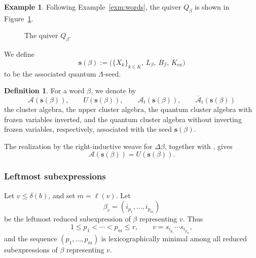 \documentclass[12pt, reqno]{amsart}
\theoremstyle{plain}
\theoremstyle{definition}
\newtheorem{definition}[theorem]{Definition}
\newtheorem{example}[theorem]{Example}
\numberwithin{equation}{section}
\begin{document}
\begin{example}\label{exm:quiver}
Following Example~\ref{exm:words}, the quiver \(Q_\beta\) is shown in
Figure~\ref{fig:Qbeta}.
\begin{figure}[htbp]
\centering
{}
\caption{The quiver \(Q_{\beta}\).}
\label{fig:Qbeta}
\end{figure}
\end{example}

We define
\[
\mathbf{s}(\beta)
:=
\bigl(\{X_k\}_{k\in K},\,L_\beta,\,B_\beta,\,K_{\mathrm{ex}}\bigr)
\]
to be the associated quantum \(\Lambda\)-seed.

\begin{definition}
For a word \(\beta\), we denote by
\[
\mathcal{A}(\mathbf{s}(\beta)),\qquad
U(\mathbf{s}(\beta)),\qquad
\mathcal{A}_t(\mathbf{s}(\beta)),\qquad
\overline{\mathcal{A}}_t(\mathbf{s}(\beta))
\]
the cluster algebra, the upper cluster algebra, the quantum cluster algebra
with frozen variables inverted, and the quantum cluster algebra without
inverting frozen variables, respectively, associated with the seed
\(\mathbf{s}(\beta)\).

The realization by the right-inductive weave for
\(\Delta\beta\), together with
\cite[Theorem~7.13]{casals2025cluster}, gives
\[
\mathcal{A}(\mathbf{s}(\beta))=U(\mathbf{s}(\beta)).
\]
\end{definition}


\subsubsection{Leftmost subexpressions}

Let \(v\le \delta(b)\), and set \(m=\ell(v)\). Let
\[
\beta_v=(i_{p_1},\dots,i_{p_m})
\]
be the leftmost reduced subexpression of \(\beta\) representing \(v\). Thus
\[
1\le p_1<\cdots<p_m\le r,
\qquad
v=s_{i_{p_1}}\cdots s_{i_{p_m}},
\]
and the sequence \((p_1,\dots,p_m)\) is lexicographically minimal among all
reduced subexpressions of \(\beta\) representing \(v\).
\end{document}
